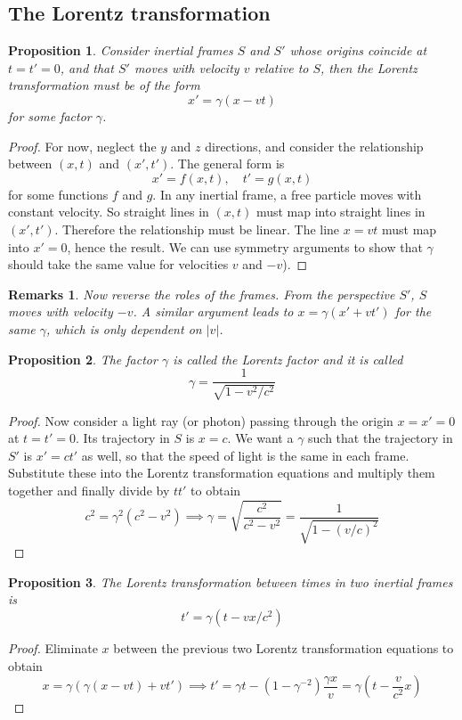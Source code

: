 \documentclass[a4paper]{article}
\newtheorem{remarks}{Remarks}[section]
\theoremstyle{new}
\newtheorem{prop}{Proposition}[section]
\begin{document}
\subsection{The Lorentz transformation}
\begin{prop}
  Consider inertial frames $S$ and $S'$ whose origins coincide at $t = t' = 0$, and that $S'$ moves with velocity $v$ relative to $S$, then the Lorentz transformation must be of the form
  $$x'=\gamma(x-vt)$$
  for some factor $\gamma$.
\end{prop}
\begin{proof}
 For now, neglect the $y$ and $z$ directions, and consider the relationship between $(x, t)$ and $(x', t')$. The general form is
$$x' = f(x, t),\quad t' = g(x, t)$$
for some functions $f$ and $g$. In any inertial frame, a free particle moves with constant velocity. So straight lines in $(x, t)$ must map into straight lines in $(x', t')$. Therefore the relationship must be linear. The line $x = vt$ must map into $x'= 0$, hence the result. We can use symmetry arguments to show that $\gamma$ should take the same value for velocities $v$ and $-v$).
\end{proof}
\begin{remarks}
Now reverse the roles of the frames. From the perspective $S'$, $S$ moves with velocity $-v$. A similar argument leads to $x=\gamma(x'+vt')$ for the same $\gamma$, which is only dependent on $|v|$.
\end{remarks}
\begin{prop}
  The factor $\gamma$ is called the Lorentz factor and it is called
  $$\gamma=\frac{1}{\sqrt{1-v^2/c^2}}$$
\end{prop}
\begin{proof}
Now consider a light ray (or photon) passing through the origin $x = x' = 0$ at $t = t' = 0$. Its trajectory in $S$ is
$x = c$. We want a $\gamma$ such that the trajectory in $S'$ is $x' = ct'$ as well, so that the speed of light is the same in each frame. Substitute these into the Lorentz transformation equations and multiply them together and finally divide by $tt'$ to obtain
$$  c^2 = \gamma^2(c^2 - v^2)\implies \gamma = \sqrt{\frac{c^2}{c^2 - v^2}} = \frac{1}{\sqrt{1 - (v/c)^2}}$$
\end{proof}
\begin{prop}
  The Lorentz transformation between times in two inertial frames is
  $$t'=\gamma(t-vx/c^2)$$
\end{prop}
\begin{proof}
Eliminate $x$ between the previous two Lorentz transformation equations to obtain
$$x = \gamma(\gamma(x - vt) + vt')\implies
t' = \gamma t - (1 - \gamma^{-2})\frac{\gamma x}{v} = \gamma\left(t - \frac{v}{c^2}x\right)$$
\end{proof}
\end{document}
